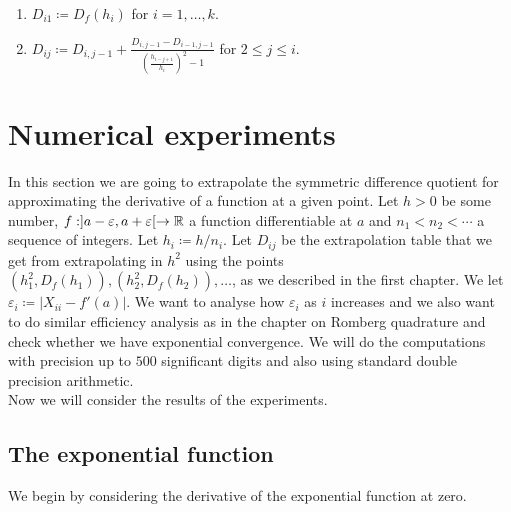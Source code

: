 \begin{enumerate}
    \item \(D_{i1} \coloneqq D_f(h_i)\) for \(i = 1,\ldots,k\).
    \item \(D_{ij} \coloneqq D_{i,j-1} + \frac{D_{i,j-1} - D_{i-1,j-1}}{\left(\frac{h_{i-j+1}}{h_i}\right)^2 - 1}\) for \(2\leq j\leq i\).
\end{enumerate}

\section{Numerical experiments}

In this section we are going to extrapolate the symmetric difference quotient for approximating the derivative of a function at a given point. Let \(h > 0\) be some number, \(f: ]a-\varepsilon, a+\varepsilon[\rightarrow \mathbb{R}\) a function differentiable at \(a\) and \(n_1 < n_2 < \cdots\) a sequence of integers. Let \(h_i \coloneqq h/n_i\). Let \(D_{ij}\) be the extrapolation table that we get from extrapolating in \(h^2\) using the points \((h_1^2,D_f(h_1)),(h_2^2,D_f(h_2)),\ldots\), as we described in the first chapter. We let \(\varepsilon_i \coloneqq |X_{ii} - f'(a)|\). We want to analyse how \(\varepsilon_i\) as \(i\) increases and we also want to do similar efficiency analysis as in the chapter on Romberg quadrature and check whether we have exponential convergence. We will do the computations with precision up to \(500\) significant digits and also using standard double precision arithmetic.\\

Now we will consider the results of the experiments.

\subsection{The exponential function}

We begin by considering the derivative of the exponential function at zero. 

